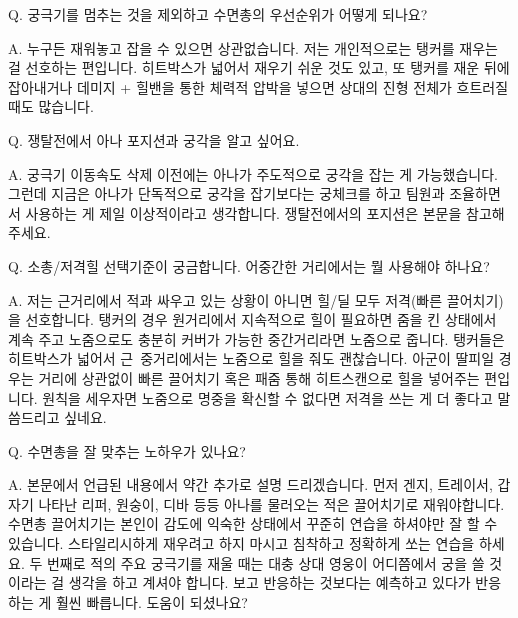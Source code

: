  

 

Q. 궁극기를 멈추는 것을 제외하고 수면총의 우선순위가 어떻게 되나요?

 

A. 누구든 재워놓고 잡을 수 있으면 상관없습니다. 저는 개인적으로는 탱커를 재우는 걸 선호하는 편입니다. 히트박스가 넓어서 재우기 쉬운 것도 있고, 또 탱커를 재운 뒤에 잡아내거나 데미지 + 힐밴을 통한 체력적 압박을 넣으면 상대의 진형 전체가 흐트러질 때도 많습니다.

 

 

Q. 쟁탈전에서 아나 포지션과 궁각을 알고 싶어요.

 

A. 궁극기 이동속도 삭제 이전에는 아나가 주도적으로 궁각을 잡는 게 가능했습니다. 그런데 지금은 아나가 단독적으로 궁각을 잡기보다는 궁체크를 하고 팀원과 조율하면서 사용하는 게 제일 이상적이라고 생각합니다. 쟁탈전에서의 포지션은 본문을 참고해주세요.

 

 

Q. 소총/저격힐 선택기준이 궁금합니다. 어중간한 거리에서는 뭘 사용해야 하나요?

 

A. 저는 근거리에서 적과 싸우고 있는 상황이 아니면 힐/딜 모두 저격(빠른 끌어치기)을 선호합니다. 탱커의 경우 원거리에서 지속적으로 힐이 필요하면 줌을 킨 상태에서 계속 주고 노줌으로도 충분히 커버가 가능한 중간거리라면 노줌으로 줍니다. 탱커들은 히트박스가 넓어서 근~중거리에서는 노줌으로 힐을 줘도 괜찮습니다. 아군이 딸피일 경우는 거리에 상관없이 빠른 끌어치기 혹은 패줌 통해 히트스캔으로 힐을 넣어주는 편입니다. 원칙을 세우자면 노줌으로 명중을 확신할 수 없다면 저격을 쓰는 게 더 좋다고 말씀드리고 싶네요.

 


Q. 수면총을 잘 맞추는 노하우가 있나요?

 

A. 본문에서 언급된 내용에서 약간 추가로 설명 드리겠습니다. 먼저 겐지, 트레이서, 갑자기 나타난 리퍼, 원숭이, 디바 등등 아나를 물러오는 적은 끌어치기로 재워야합니다. 수면총 끌어치기는 본인이 감도에 익숙한 상태에서 꾸준히 연습을 하셔야만 잘 할 수 있습니다. 스타일리시하게 재우려고 하지 마시고 침착하고 정확하게 쏘는 연습을 하세요. 두 번째로 적의 주요 궁극기를 재울 때는 대충 상대 영웅이 어디쯤에서 궁을 쓸 것이라는 걸 생각을 하고 계셔야 합니다. 보고 반응하는 것보다는 예측하고 있다가 반응하는 게 훨씬 빠릅니다. 도움이 되셨나요?

 

